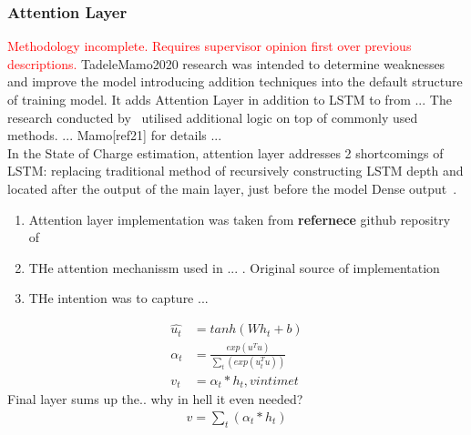 \subsubsection{Attention Layer}
\textcolor{red}{Methodology incomplete. Requires supervisor opinion first over previous descriptions.}
TadeleMamo2020 research was intended to determine weaknesses and improve the model introducing addition techniques into the default structure of training model.
It adds Attention Layer in addition to LSTM to from ...
The research conducted by~\cite{mamo_long_2020} utilised additional logic on top of commonly used methods.
... Mamo[ref21] for details ...\\
In the State of Charge estimation, attention layer addresses 2 shortcomings of LSTM: replacing traditional method of recursively constructing LSTM depth and located after the output of the main layer, just before the model Dense output~\cite{mamo_long_2020}. \\
%
\begin{enumerate}
    \item Attention layer implementation was taken from \textbf{refernece} github repositry of~\cite{attention_8461990}
    \item THe attention mechanissm used in ... . Original source of implementation~\cite{attention_yang_hierarchical_2016}
    \item THe intention was to capture ...
\end{enumerate}
\begin{equation}
    \begin{split}
        \hat{u_t} &= tanh \left(W h_{t} + b \right) \\
             \alpha_t &= \frac{exp(u^T u)}{\sum_t(exp(u_t^T u))} \\
              v_t &= \alpha_t*h_t, v in time t
    \end{split}
    \label{eq:AttentionWithContext}
\end{equation}
Final layer sums up the.. why in hell it even needed?
\begin{equation}
    \begin{split}
        v = \sum_t(\alpha_t * h_t)
    \end{split}
    \label{eq:Addition}
\end{equation}

